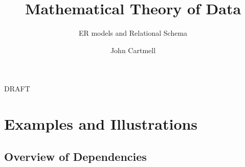 \documentclass[10pt,a4paper]{scrartcl}
\begin{document}
\title{Mathematical Theory of Data}
\subtitle{ER models and Relational Schema}
\author{John Cartmell}
\maketitle
\begin{center}
DRAFT
\end{center}







\newpage
\appendix

\section{Examples and Illustrations}







\begin{landscape}
\section{Overview of Dependencies}

\end{landscape}

 

\printindex[definitions]

\printindex[lemmas]
	 
\end{document}
